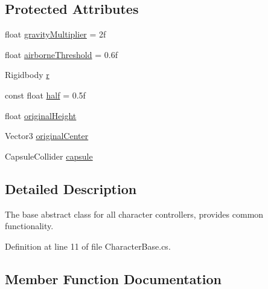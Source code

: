 \subsection*{Protected Attributes}
\begin{DoxyCompactItemize}
\item 
float \mbox{\hyperlink{class_root_motion_1_1_demos_1_1_character_base_adb20e615f42b0c87be9589a217f09c9d}{gravity\+Multiplier}} = 2f
\item 
float \mbox{\hyperlink{class_root_motion_1_1_demos_1_1_character_base_a412071d0d48023310ccc7d1625e5a1d3}{airborne\+Threshold}} = 0.\+6f
\item 
Rigidbody \mbox{\hyperlink{class_root_motion_1_1_demos_1_1_character_base_acbb46362a91c1781f64feb7c486bd173}{r}}
\item 
const float \mbox{\hyperlink{class_root_motion_1_1_demos_1_1_character_base_ab240e377bfaf2679c641772dfd2bca71}{half}} = 0.\+5f
\item 
float \mbox{\hyperlink{class_root_motion_1_1_demos_1_1_character_base_a42b4020a3dfb9f7054f95edc399fb16f}{original\+Height}}
\item 
Vector3 \mbox{\hyperlink{class_root_motion_1_1_demos_1_1_character_base_a87cc172eea87af0d3b71a923efe2095c}{original\+Center}}
\item 
Capsule\+Collider \mbox{\hyperlink{class_root_motion_1_1_demos_1_1_character_base_ad8ef3b30f84bf519e6eb4448c1cabcbd}{capsule}}
\end{DoxyCompactItemize}


\subsection{Detailed Description}
The base abstract class for all character controllers, provides common functionality. 



Definition at line 11 of file Character\+Base.\+cs.



\subsection{Member Function Documentation}
\mbox{\label{class_root_motion_1_1_demos_1_1_character_base_a03c29b9eeaf29a2591eeb45edeab8483}} 
